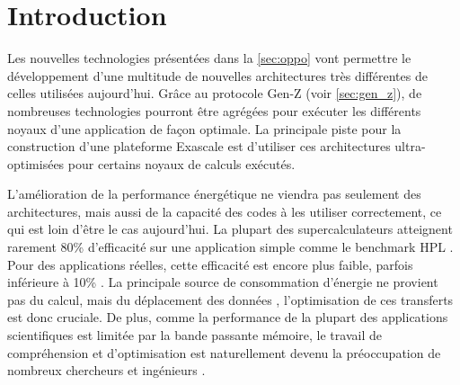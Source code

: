 \section{Introduction} \label{sec:dev_intro}
    

Les nouvelles technologies présentées dans la \autoref{sec:oppo} vont permettre le développement d'une multitude de nouvelles architectures très différentes de celles utilisées aujourd'hui. Grâce au protocole Gen-Z (voir \autoref{sec:gen_z}), de nombreuses technologies pourront être agrégées pour exécuter les différents noyaux d'une application de façon optimale. La principale piste pour la construction d'une plateforme Exascale est d'utiliser ces architectures ultra-optimisées pour certains noyaux de calculs exécutés.

L'amélioration de la performance énergétique ne viendra pas seulement des architectures, mais aussi de la capacité des codes à les utiliser correctement, ce qui est loin d'être le cas aujourd'hui. La plupart des supercalculateurs atteignent rarement 80\% d'efficacité sur une application simple comme le \gls{benchmark} HPL \cite{Dongarra2003}. Pour des applications réelles, cette efficacité est encore plus faible, parfois inférieure à 10\% \cite{Oliker2005}. La principale source de consommation d'énergie ne provient pas du calcul, mais du déplacement des données \cite{Kothe2016}, l'optimisation de ces transferts est donc cruciale. De plus, comme la performance de la plupart des applications scientifiques est limitée par la bande passante mémoire, le travail de compréhension et d'optimisation est naturellement devenu la préoccupation de nombreux chercheurs et ingénieurs \cite{McCalpin1995}.
    

